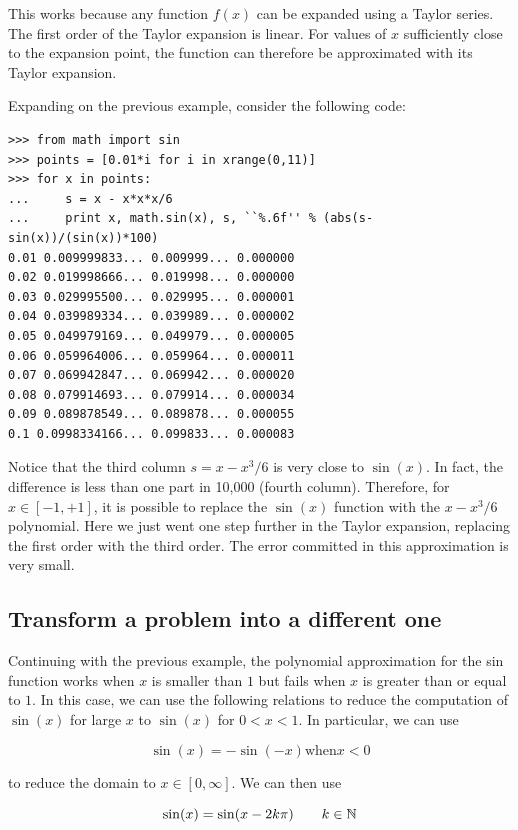 \documentclass[justified,sixbynine]{tufte-book}
\theoremstyle{plain}%
\theoremstyle{definition}
\theoremstyle{remark}
\begin{document}
\begin{fullwidth}
This works because any function $f(x)$ can be expanded using a Taylor series. The first order of the Taylor expansion is linear. For values of $x$ sufficiently close to the expansion point, the function can therefore be approximated with its Taylor expansion.

Expanding on the previous example, consider the following code:

\begin{lstlisting}
>>> from math import sin
>>> points = [0.01*i for i in xrange(0,11)]
>>> for x in points:
...     s = x - x*x*x/6
...     print x, math.sin(x), s, ``%.6f'' % (abs(s-sin(x))/(sin(x))*100)
0.01 0.009999833... 0.009999... 0.000000
0.02 0.019998666... 0.019998... 0.000000
0.03 0.029995500... 0.029995... 0.000001
0.04 0.039989334... 0.039989... 0.000002
0.05 0.049979169... 0.049979... 0.000005
0.06 0.059964006... 0.059964... 0.000011
0.07 0.069942847... 0.069942... 0.000020
0.08 0.079914693... 0.079914... 0.000034
0.09 0.089878549... 0.089878... 0.000055
0.1 0.0998334166... 0.099833... 0.000083
\end{lstlisting}

Notice that the third column $s = x - x^3/6$ is very close to $\sin(x)$. In fact, the difference is less than one part in 10,000 (fourth column). Therefore, for $x \in [-1,+1]$, it is possible to replace the $\sin(x)$ function with the $x-x^3/6$ polynomial. Here we just went one step further in the Taylor expansion, replacing the first order with the third order. The error committed in this approximation is very small.


\goodbreak\subsection{Transform a problem into a different one}

Continuing with the previous example, the polynomial approximation for the sin function works when $x$ is smaller than $1$ but fails when $x$ is greater than or equal to $1$. In this case, we can use the following relations to reduce the computation of $\sin(x)$ for large $x$ to $\sin(x)$ for $0<x<1$. In particular, we can use

\begin{equation}
\sin(x) = -\sin(-x) \textrm{when} x < 0
\end{equation}

to reduce the domain to $x \in [0,\infty]$. We can then use

\begin{equation}
\sin(x) = \sin(x - 2k\pi) \qquad k\in {\Bbb N}
\end{equation}


\end{fullwidth}
\end{document}
